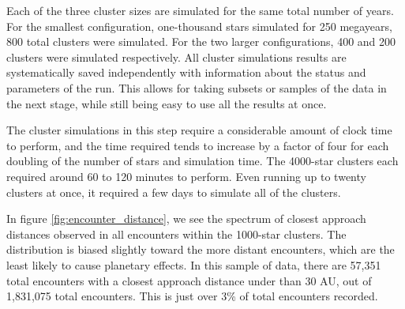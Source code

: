 \documentclass[12pt]{article}
\begin{document}
    Each of the three cluster sizes are simulated for the same total number of years.
    For the smallest configuration, one-thousand stars simulated for 250 megayears, 
    800 total clusters were simulated. For the two larger configurations, 400 and 200
    clusters were simulated respectively. All cluster simulations results are systematically 
    saved independently with information about the status and parameters of the run.
    This allows for taking subsets or samples of the data in the next stage, while still
    being easy to use all the results at once.

    The cluster simulations in this step require a considerable amount of clock time to perform,
    and the time required tends to increase by a factor of four for each doubling of the
    number of stars and simulation time. The 4000-star clusters each required around 60 to 120 minutes
    to perform. Even running up to twenty clusters at once, it required a few days to 
    simulate all of the clusters.

    In figure \ref{fig:encounter_distance}, we see the spectrum of closest approach
    distances observed in all encounters within the 1000-star clusters. The
    distribution is biased slightly toward the more distant encounters, which
    are the least likely to cause planetary effects. In this sample of data, there are
    57,351 total encounters with a closest approach distance under than 30 AU, 
    out of 1,831,075 total encounters. 
    This is just over 3\% of total encounters recorded. %
\end{document}
